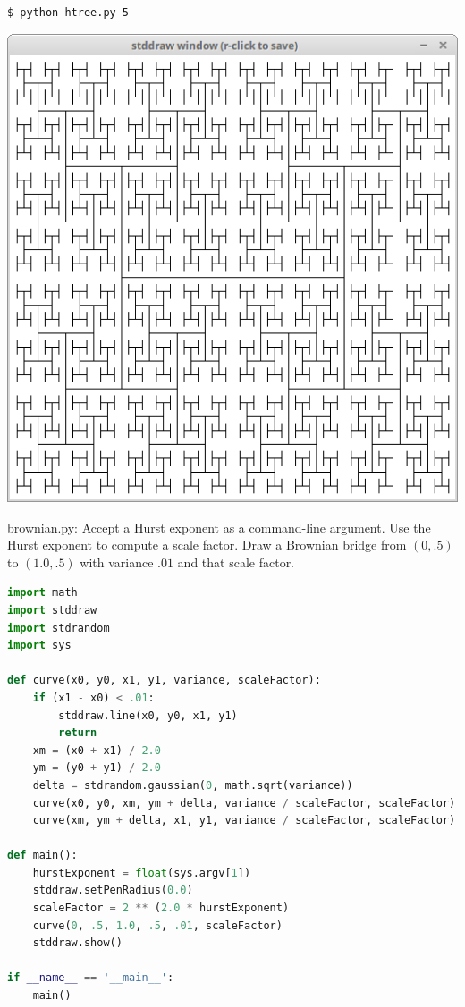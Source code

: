 \documentclass[8pt,a4paper,compress,handout]{beamer}
\begin{document}
\begin{frame}[fragile]
\begin{minipage}{160pt}
\begin{lstlisting}[language={}]
$ python htree.py 5
\end{lstlisting}
\end{minipage}%
\begin{minipage}{140pt}
\hfill \includegraphics[scale=0.15]{figures/htree3.png}
\end{minipage}
\end{frame}

\begin{frame}[fragile]
\begin{framed}
\tiny brownian.py: Accept a Hurst exponent as a command-line argument. Use the Hurst exponent to compute a scale factor. Draw a Brownian bridge from $(0, .5)$ to $(1.0, .5)$ with variance $.01$ and that scale factor.
\end{framed}

\begin{lstlisting}[language=Python]
import math
import stddraw
import stdrandom
import sys

def curve(x0, y0, x1, y1, variance, scaleFactor):
    if (x1 - x0) < .01:
        stddraw.line(x0, y0, x1, y1)
        return
    xm = (x0 + x1) / 2.0
    ym = (y0 + y1) / 2.0
    delta = stdrandom.gaussian(0, math.sqrt(variance))
    curve(x0, y0, xm, ym + delta, variance / scaleFactor, scaleFactor)
    curve(xm, ym + delta, x1, y1, variance / scaleFactor, scaleFactor)

def main():
    hurstExponent = float(sys.argv[1])
    stddraw.setPenRadius(0.0)
    scaleFactor = 2 ** (2.0 * hurstExponent)
    curve(0, .5, 1.0, .5, .01, scaleFactor)
    stddraw.show()

if __name__ == '__main__':
    main()
\end{lstlisting}
\end{frame}
\end{document}
